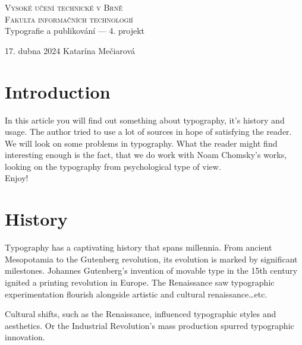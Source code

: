 \documentclass[11pt]{article}
\begin{document}
    \begin{titlepage}
        \begin{center}
            \Huge\textsc{Vysoké učení technické v Brně}\\
            \huge\textsc{Fakulta informačních technologií}\\
            {Typografie a publikování –– 4. projekt}\\

        \end{center}
        {\LARGE 17. dubna 2024 \hfill
        Katarína Mečiarová}

    \end{titlepage}

    \tableofcontents
    \renewcommand{\cftsecleader}{\cftdotfill{\cftdotsep}}
    \setlength{\cftbeforesecskip}{0.5em}

    \newpage

    \section{Introduction}
    In this article you will find out something about typography, it's history and usage.
    The author tried to use a lot of sources in hope of satisfying the reader. \\
    We will look on some problems in typography. What the reader might find interesting enough
    is the fact, that we do work with Noam Chomsky's works, looking on the typography
    from psychological type of view. \\ Enjoy!

    \section{History}
    Typography has a captivating history that spans millennia.
    From ancient Mesopotamia to the Gutenberg revolution, its evolution is marked by significant milestones.
    Johannes Gutenberg's invention of movable type in the 15th century ignited a printing revolution in Europe.
    The Renaissance saw typographic experimentation flourish alongside artistic and cultural renaissance\ldots etc.

    Cultural shifts, such as the Renaissance, influenced typographic styles and aesthetics.
    Or the Industrial Revolution's mass production spurred typographic innovation.
\end{document}
